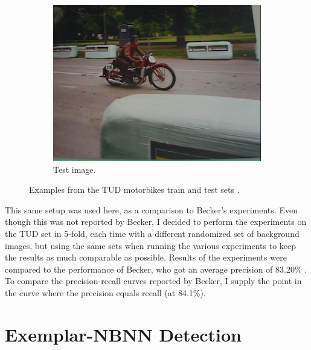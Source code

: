 \begin{figure}[b]
\begin{subfigure}[b]{0.30\textwidth}
        \centering
        \includegraphics[width=\textwidth]{tudtest2}
        \caption{Test image.}
        \label{fig:tud3}
    \end{subfigure}
    \caption{Examples from the TUD motorbikes train and test sets \cite{becker2012codebook, fritz2005integrating}.}
    \label{fig:tudmotorbikes}
\end{figure}

This same setup was used here, as a comparison to Becker's experiments. Even though this was not reported by Becker, I decided to perform the experiments on the TUD set in 5-fold, each time with a different randomized set of background images, but using the same sets when running the various experiments to keep the results as much comparable as possible. Results of the experiments were compared to the performance of Becker, who got an average precision of 83.20\% \cite{becker2012codebook}. To compare the precision-recall curves reported by Becker, I supply the point in the curve where the precision equals recall (at 84.1\%).



% 

\section{Exemplar-NBNN Detection} %
\label{sec:nbnn_detection}

